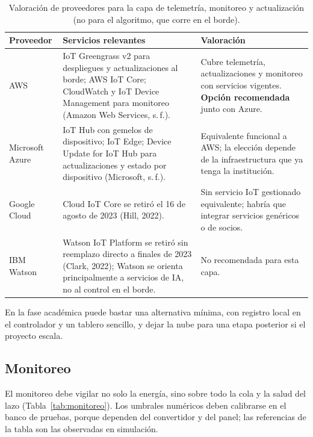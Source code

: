 \documentclass[letterpaper,11pt]{article}
\begin{document}
\begin{table}[H]
  \centering
  \caption{Valoración de proveedores para la capa de telemetría, monitoreo y actualización (no para el algoritmo, que corre en el borde).}
  \label{tab:proveedores}
  \footnotesize
  \begin{tabularx}{\linewidth}{@{}p{2.3cm}Lp{5.2cm}@{}}
    \toprule
    \textbf{Proveedor} & \textbf{Servicios relevantes} & \textbf{Valoración} \\
    \midrule
    AWS & IoT Greengrass v2 para despliegues y actualizaciones al borde; AWS IoT Core; CloudWatch y IoT Device Management para monitoreo (Amazon Web Services, s.\,f.). & Cubre telemetría, actualizaciones y monitoreo con servicios vigentes. \textbf{Opción recomendada} junto con Azure. \\
    Microsoft Azure & IoT Hub con gemelos de dispositivo; IoT Edge; Device Update for IoT Hub para actualizaciones y estado por dispositivo (Microsoft, s.\,f.). & Equivalente funcional a AWS; la elección depende de la infraestructura que ya tenga la institución. \\
    Google Cloud & Cloud IoT Core se retiró el 16 de agosto de 2023 (Hill, 2022). & Sin servicio IoT gestionado equivalente; habría que integrar servicios genéricos o de socios. \\
    IBM Watson & Watson IoT Platform se retiró sin reemplazo directo a finales de 2023 (Clark, 2022); Watson se orienta principalmente a servicios de IA, no al control en el borde. & No recomendada para esta capa. \\
    \bottomrule
  \end{tabularx}
\end{table}

En la fase académica puede bastar una alternativa mínima, con registro local en el controlador y un tablero sencillo, y dejar la nube para una etapa posterior si el proyecto escala.

\subsection{Monitoreo}
El monitoreo debe vigilar no solo la energía, sino sobre todo la cola y la salud del lazo (Tabla~\ref{tab:monitoreo}). Los umbrales numéricos deben calibrarse en el banco de pruebas, porque dependen del convertidor y del panel; las referencias de la tabla son las observadas en simulación.
\end{document}
